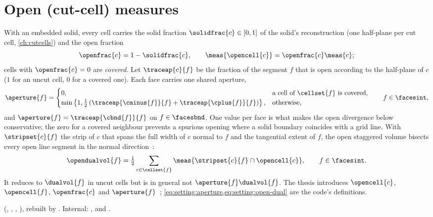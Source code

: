 \section{Open (cut-cell) measures}\label{sec:setting:open}
With an embedded solid, every cell carries the solid fraction
$\solidfrac{c}\in[0,1]$ of the solid's reconstruction (one half-plane per cut
cell, \cref{ch:cutcells}) and the open fraction
\begin{equation}\label{eq:setting:open-fraction}
  \openfrac{c}=1-\solidfrac{c},\qquad \meas{\opencell{c}}=\openfrac{c}\meas{c};
\end{equation}
cells with $\openfrac{c}=0$ are \emph{covered}. Let $\traceap{c}{f}$ be the
fraction of the segment $f$ that is open according to the half-plane of $c$
($1$ for an uncut cell, $0$ for a covered one). Each face carries one shared
aperture,
\begin{equation}\label{eq:setting:aperture}
  \aperture{f}=\begin{cases}
    0, & \text{a cell of }\cellset{f}\text{ is covered},\\
    \min\curlypar{1,\tfrac12\roundpar{\traceap{\cminus{f}}{f}+\traceap{\cplus{f}}{f}}}, & \text{otherwise},
  \end{cases}\qquad f\in\facesint,
\end{equation}
and $\aperture{f}=\traceap{\cbnd{f}}{f}$ on $f\in\facesbnd$. One value per face
is what makes the open divergence below conservative; the zero for a covered
neighbour prevents a spurious opening where a solid boundary coincides with a
grid line. With $\stripset{c}{f}$ the strip of $c$ that spans the full width of
$c$ normal to $f$ and the tangential extent of $f$, the open staggered volume
bisects every open line segment in the normal
direction~\cite{verstappen2005}:
\begin{equation}\label{eq:setting:open-dual}
  \opendualvol{f}=\tfrac12\sum_{c\in\cellset{f}}\meas{\stripset{c}{f}\cap\opencell{c}},
  \qquad f\in\facesint .
\end{equation}
It reduces to $\dualvol{f}$ in uncut cells but is in general not
$\aperture{f}\dualvol{f}$. The thesis introduces $\opencell{c}$,
$\opencell{f}$, $\openfrac{c}$ and $\aperture{f}$~;
\cref{eq:setting:aperture,eq:setting:open-dual} are the code's definitions.

\begin{implnote}
 (, ,
, ), rebuilt by
. Internal:
,
 and
.
\end{implnote}

